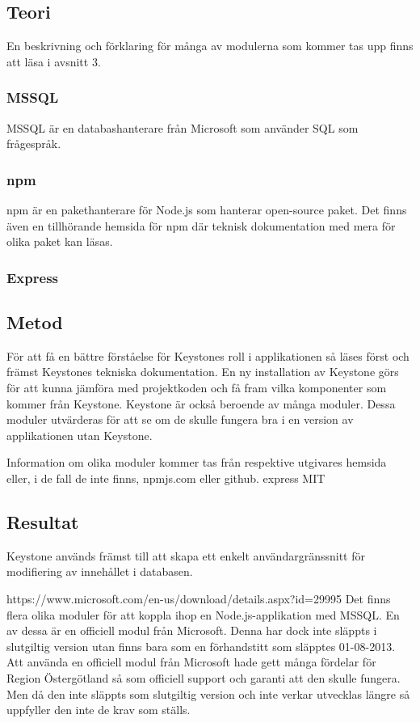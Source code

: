 \subsection{Teori}
En beskrivning och förklaring för många av modulerna som kommer tas upp finns att läsa i avsnitt 3.
\subsubsection{MSSQL}
MSSQL är en databashanterare från Microsoft som använder SQL som frågespråk.

\subsubsection{npm}
npm är en pakethanterare för Node.js som hanterar open-source paket. Det finns även en tillhörande hemsida för npm där teknisk dokumentation med mera för olika paket kan läsas. 

\subsubsection{Express}



\subsection{Metod}
För att få en bättre förståelse för Keystones roll i applikationen så läses först och främst Keystones tekniska dokumentation. En ny installation av Keystone görs för att kunna jämföra med projektkoden och få fram vilka komponenter som kommer från Keystone. Keystone är också beroende av många moduler. Dessa moduler utvärderas för att se om de skulle fungera bra i en version av applikationen utan Keystone. 

Information om olika moduler kommer tas från respektive utgivares hemsida eller, i de fall de inte finns, npmjs.com eller github.
express MIT

\subsection{Resultat}
Keystone används främst till att skapa ett enkelt användargränssnitt för modifiering av innehållet i databasen. 

https://www.microsoft.com/en-us/download/details.aspx?id=29995
Det finns flera olika moduler för att koppla ihop en Node.js-applikation med MSSQL. En av dessa är en officiell modul från Microsoft. Denna har dock inte släppts i slutgiltig version utan finns bara som en förhandstitt som släpptes 01-08-2013. Att använda en officiell modul från Microsoft hade gett många fördelar för Region Östergötland så som officiell support och garanti att den skulle fungera. Men då den inte släppts som slutgiltig version och inte verkar utvecklas längre så uppfyller den inte de krav som ställs. 
